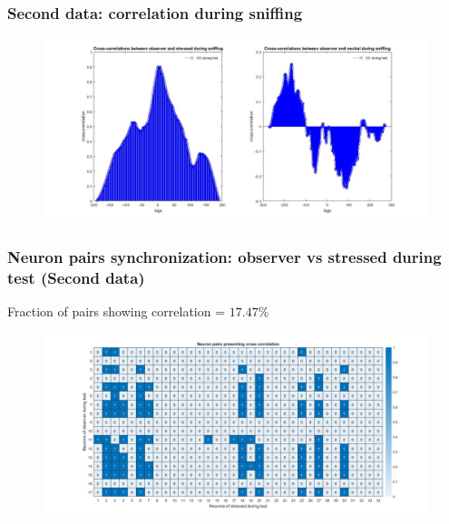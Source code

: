 \documentclass{beamer}
\begin{document}
\begin{frame}
\frametitle{Second data: correlation during sniffing}





\begin{figure}[H]
	\begin{center}
		\hspace*{-1cm}
		\includegraphics[scale=.30]{sniff_corr2.jpg} 
	\end{center}  
	
	
\end{figure}


\end{frame}	






\begin{frame}
\frametitle{Neuron pairs synchronization: observer vs stressed during test (Second data)}


Fraction of pairs showing correlation = $17.47 \%$


\begin{figure}[H]
\begin{center}
\hspace*{-1cm}
\includegraphics[scale=.30]{neur_corr_stress2.jpg} 
\end{center}  


\end{figure}


\end{frame}	
\end{document}
